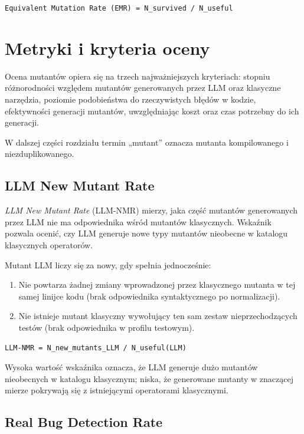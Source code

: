 \documentclass[12pt,a4paper,oldfontcommands]{memoir}
\theoremstyle{plain}
\theoremstyle{definition}
\theoremstyle{remark}
\begin{document}
    \begin{center}
        \texttt{Equivalent Mutation Rate (EMR) = N\_survived / N\_useful}
    \end{center}

    \section{Metryki i kryteria oceny}

    Ocena mutantów opiera się na trzech najważniejszych kryteriach: stopniu różnorodności względem mutantów generowanych przez LLM oraz klasyczne narzędzia, poziomie podobieństwa do rzeczywistych błędów w kodzie, efektywności generacji mutantów, uwzględniając koszt oraz czas potrzebny do ich generacji.

    W dalszej części rozdziału termin „mutant” oznacza mutanta kompilowanego i niezduplikowanego.

    \subsection{LLM New Mutant Rate}

    \textit{LLM New Mutant Rate} (LLM-NMR) mierzy, jaka część mutantów generowanych przez LLM nie ma odpowiednika wśród mutantów klasycznych.
    Wskaźnik pozwala ocenić, czy LLM generuje nowe typy mutantów nieobecne w katalogu klasycznych operatorów.

    Mutant LLM liczy się za nowy, gdy spełnia jednocześnie:
    \begin{enumerate}
        \item Nie powtarza żadnej zmiany wprowadzonej przez klasycznego mutanta w tej samej linijce kodu (brak odpowiednika syntaktycznego po normalizacji).
        \item Nie istnieje mutant klasyczny wywołujący ten sam zestaw nieprzechodzących testów (brak odpowiednika w profilu testowym).
    \end{enumerate}

    \begin{center}
        \texttt{LLM-NMR = N\_new\_mutants\_LLM / N\_useful(LLM)}
    \end{center}

    Wysoka wartość wskaźnika oznacza, że LLM generuje dużo mutantów nieobecnych w katalogu klasycznym; niska, że generowane mutanty w znaczącej mierze pokrywają się z istniejącymi operatorami klasycznymi.

    \subsection{Real Bug Detection Rate}
\end{document}
